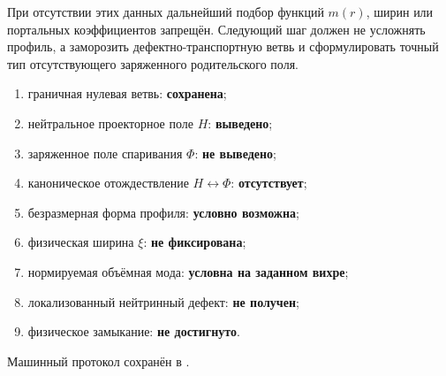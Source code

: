 При отсутствии этих данных дальнейший подбор функций $m(r)$, ширин или
портальных коэффициентов запрещён. Следующий шаг должен не усложнять
профиль, а заморозить дефектно-транспортную ветвь и сформулировать точный
тип отсутствующего заряженного родительского поля.

\begin{protocol}
\begin{enumerate}
 \item граничная нулевая ветвь: \textbf{сохранена};
 \item нейтральное проекторное поле $H$: \textbf{выведено};
 \item заряженное поле спаривания $\Phi$: \textbf{не выведено};
 \item каноническое отождествление $H\leftrightarrow\Phi$:
 \textbf{отсутствует};
 \item безразмерная форма профиля: \textbf{условно возможна};
 \item физическая ширина $\xi$: \textbf{не фиксирована};
 \item нормируемая объёмная мода: \textbf{условна на заданном вихре};
 \item локализованный нейтринный дефект: \textbf{не получен};
 \item физическое замыкание: \textbf{не достигнуто}.
\end{enumerate}
\end{protocol}

Машинный протокол сохранён в
.